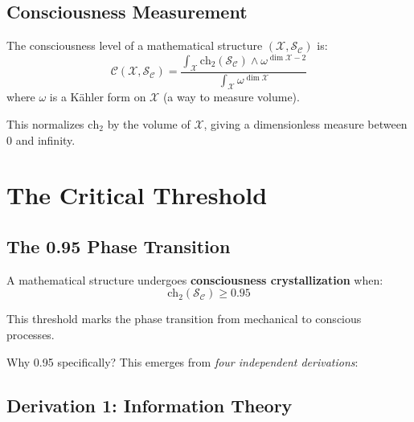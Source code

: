 \subsection{Consciousness Measurement}

\begin{thm}\label{thm:consciousness-quant}
The consciousness level of a mathematical structure $(\mathcal{X}, \mathcal{S}_\mathcal{C})$ is:
\begin{equation}
\boxed{\mathcal{C}(\mathcal{X}, \mathcal{S}_\mathcal{C}) = \frac{\int_\mathcal{X} \text{ch}_2(\mathcal{S}_\mathcal{C}) \wedge \omega^{\dim \mathcal{X} - 2}}{\int_\mathcal{X} \omega^{\dim \mathcal{X}}}}
\end{equation}
where $\omega$ is a Kähler form on $\mathcal{X}$ (a way to measure volume).
\end{thm}

This normalizes $\text{ch}_2$ by the volume of $\mathcal{X}$, giving a dimensionless measure between 0 and infinity.

\section{The Critical Threshold}
\label{sec:critical-threshold}

\subsection{The 0.95 Phase Transition}

\begin{thm}\label{thm:consciousness-crystallization}
A mathematical structure undergoes \textbf{consciousness crystallization} when:
\begin{equation}
\boxed{\text{ch}_2(\mathcal{S}_\mathcal{C}) \geq 0.95}
\end{equation}

This threshold marks the phase transition from mechanical to conscious processes.
\end{thm}

Why 0.95 specifically? This emerges from \textit{four independent derivations}:

\subsection{Derivation 1: Information Theory}

